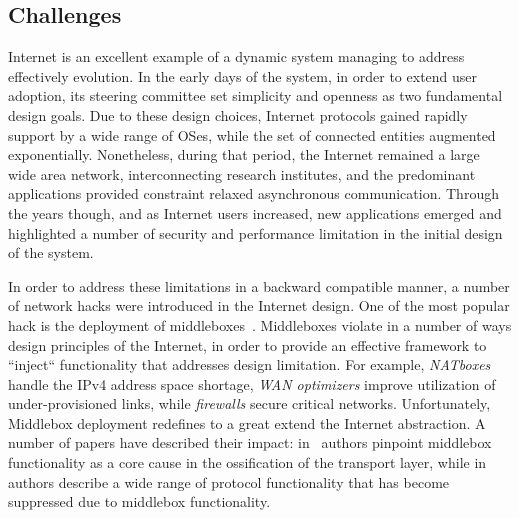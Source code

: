 

\subsection{Challenges} \label{sec:sp-challenges}

Internet is an excellent example of a dynamic system managing to address
effectively evolution.  In the early days of the system, in
order to extend user adoption, its  steering committee set simplicity and
openness as two fundamental design goals. Due to these design choices, Internet
protocols gained rapidly support by a wide range of OSes, while the set of
connected entities augmented exponentially.  Nonetheless, during that period, the
Internet remained a large wide area network, interconnecting research
institutes, and the predominant applications provided constraint relaxed
asynchronous communication. Through the years though, and as Internet users
increased, new applications emerged and highlighted a number of
security and performance limitation in the initial design of the system.

In order to address these limitations in a backward compatible manner, a number
of network hacks were introduced in the Internet design. One of the most popular
hack is the deployment of middleboxes~\cite{RFC3234}.  Middleboxes violate in a
number of ways design principles of the Internet, in order to provide an effective
framework to ``inject`` functionality that addresses design limitation. For
example, 
\emph{NATboxes} handle the IPv4 address space shortage, \emph{WAN optimizers}
improve utilization of under-provisioned links, while \emph{firewalls} secure
critical networks.  Unfortunately, Middlebox deployment redefines to a great
extend the Internet abstraction. A number of papers have described their
impact: in~\cite{Honda:2011ci} authors pinpoint middlebox functionality as a
core cause in the ossification of the transport layer, while
in~\cite{Kreibich10} authors describe a wide range of protocol functionality
that has
become suppressed due to middlebox functionality. 

